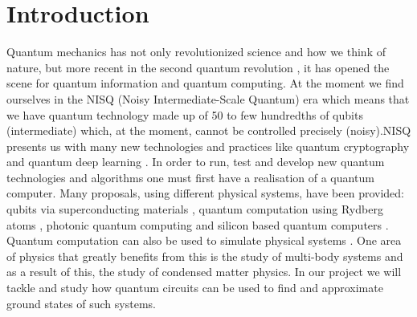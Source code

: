 \documentclass{physics_article}
\date{}
\begin{document}
	\maketitle

	\section{Introduction \label{intro}}
	Quantum mechanics has not only revolutionized science and how we think of nature, but more recent in the second quantum revolution \cite{https://doi.org/10.48550/arxiv.quant-ph/0206091}, it has opened the scene for quantum information and quantum computing. At the moment we find ourselves in the NISQ (Noisy Intermediate-Scale Quantum) era \cite{Preskill2018quantumcomputingin} which means that we have quantum technology made up of 50 to few hundredths of qubits (intermediate) which, at the moment, cannot be controlled precisely (noisy).NISQ presents us with many new technologies and practices like quantum cryptography \cite{bernstein_buchmann_dahmen_2009} and quantum deep learning \cite{https://doi.org/10.48550/arxiv.1711.02038}. In order to run, test and develop new quantum technologies and algorithms one must first have a realisation of a quantum computer. Many proposals, using different physical systems, have been provided: qubits via superconducting materials \cite{PhysRevLett.85.2208, nakamura_pashkin_tsai_1999}, quantum computation using Rydberg atoms \cite{PhysRevLett.74.4091,PhysRevLett.75.4714}, photonic quantum computing \cite{knill_laflamme_milburn_2001,doi:10.1126/science.abe8770} and silicon based quantum computers \cite{kane_1998,madzik_asaad_youssry_joecker_rudinger_nielsen_young_proctor_baczewski_laucht_et}. Quantum computation can also be used to simulate physical systems \cite{feynman_1982}. One area of physics that greatly benefits from this is the study of multi-body systems and as a result of this, the study of condensed matter physics. In our project we will tackle and study how quantum circuits can be used to find and approximate ground states of such systems.
\end{document}
